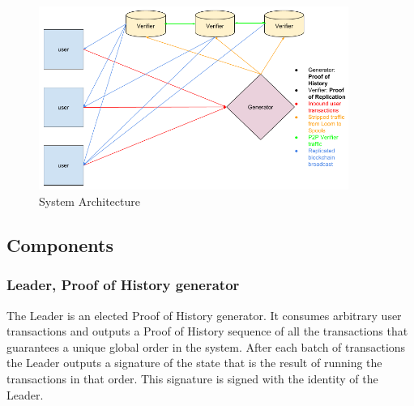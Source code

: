 \documentclass[12pt]{article}
\begin{document}
\begin{figure}
  \begin{center}
    \centering
    \includegraphics[width=0.9\textwidth]{figures/system_arch_001.png}
    \caption[Fig 9]{System Architecture \label{fig_9}}
  \end{center}
  \end{figure}

\subsection{Components}

\subsubsection{Leader, Proof of History generator}
The Leader is an elected Proof of History generator. It consumes arbitrary user transactions and outputs a Proof of History sequence of all the transactions that guarantees a unique global order in the system. After each batch of transactions the Leader outputs a signature of the state that is the result of running the transactions in that order. This signature is signed with the identity of the Leader.
\end{document}
